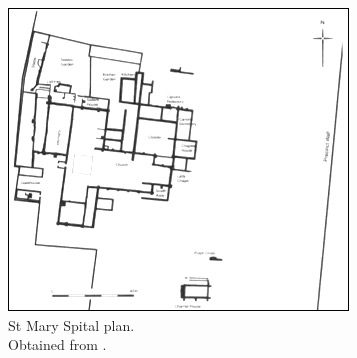 \documentclass[%
	]{ijsra}
\begin{document}
	\begin{figure}
		\includegraphics[width=\linewidth]{figures/Pereda-Figure03}
		\caption{St Mary Spital plan.
		        {\normalfont\scriptsize \\ Obtained from \textcite[98, fig. 37]{Thomas_2002}.
		                  }}
		\label{fig:Pereda-Figure03}
	\end{figure}
\end{document}
